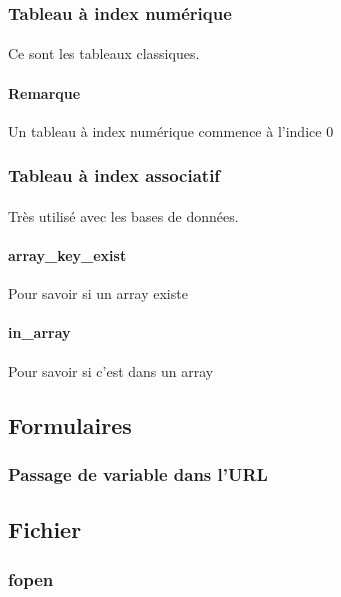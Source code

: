 \documentclass[12pt,a4paper,openany]{article}
\begin{document}
			\subsubsection{Tableau à index numérique}
			\paragraph{} Ce sont les tableaux classiques.
				
			\paragraph{Remarque}Un tableau à index numérique commence à l'indice 0
			\subsubsection{Tableau à index associatif}
			\paragraph{} Très utilisé avec les bases de données.
				
			\paragraph{array\_key\_exist} Pour savoir si un array existe
			\paragraph{in\_array} Pour savoir si c'est dans un array 
		\subsection{Formulaires}
				
				
			\subsubsection{Passage de variable dans l'URL}
				
				
		\subsection{Fichier}
			\subsubsection{fopen}
				
\end{document}
